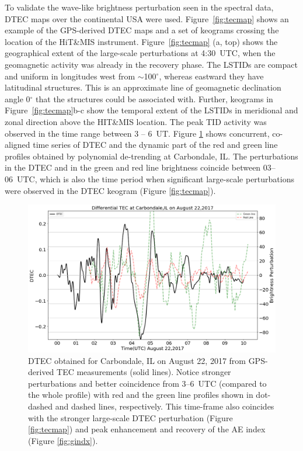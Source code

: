 \documentclass[crop=false,class=mitthesis,oneside,font=12pt]{standalone}
\begin{document}
To validate the wave-like brightness perturbation seen in the spectral data, DTEC maps over the continental USA were used. Figure~\ref{fig:tecmap} shows an example of the GPS-derived DTEC maps and a set of keograms crossing the location of the HiT\&MIS instrument. Figure~\ref{fig:tecmap} (a, top) shows the geographical extent of the large-scale perturbations at 4:30~UTC, when the geomagnetic activity was already in the recovery phase. The LSTIDs are compact and uniform in longitudes west from $\sim$100$^\circ$, whereas eastward they have latitudinal structures. This is an approximate line of geomagnetic declination angle 0$^\circ$ that the structures could be associated with. Further, keograms in Figure~\ref{fig:tecmap}b-c show the temporal extent of the LSTIDs in meridional and zonal direction above the HIT\&MIS location. The peak TID activity was observed in the time range between 3 -- 6~UT. Figure \ref{fig:dtec_carb} shows concurrent, co-aligned time series of DTEC and the dynamic part of the red and green line profiles obtained by polynomial de-trending at Carbondale, IL. The perturbations in the DTEC and in the green and red line brightness coincide between 03--06~UTC, which is also the time period when significant large-scale perturbations were observed in the DTEC keogram (Figure \ref{fig:tecmap}). 

\begin{figure}[H]
	\centering\includegraphics[width=35pc]{aug22_dtec_bper.png}
	\caption{DTEC obtained for Carbondale, IL on August 22, 2017 from GPS-derived TEC measurements (solid lines).  Notice stronger perturbations  and better coincidence from 3--6~UTC (compared to the whole profile) with red and the green line profiles shown in dot-dashed and dashed lines, respectively. This time-frame also coincides with the stronger large-scale DTEC perturbation (Figure \ref{fig:tecmap}) and peak enhancement and recovery of the AE index (Figure \ref{fig:gindx}).}
	\label{fig:dtec_carb}
\end{figure}
\end{document}
